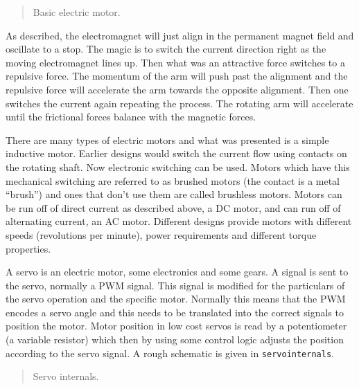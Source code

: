 \begin{quote}
Basic electric motor.
\end{quote}

As described, the electromagnet will just align in the permanent magnet
field and oscillate to a stop. The magic is to switch the current
direction right as the moving electromagnet lines up. Then what was an
attractive force switches to a repulsive force. The momentum of the arm
will push past the alignment and the repulsive force will accelerate the
arm towards the opposite alignment. Then one switches the current again
repeating the process. The rotating arm will accelerate until the
frictional forces balance with the magnetic forces.

There are many types of electric motors and what was presented is a
simple inductive motor. Earlier designs would switch the current flow
using contacts on the rotating shaft. Now electronic switching can be
used. Motors which have this mechanical switching are referred to as
brushed motors (the contact is a metal ``brush'') and ones that don't
use them are called brushless motors. Motors can be run off of direct
current as described above, a DC motor, and can run off of alternating
current, an AC motor. Different designs provide motors with different
speeds (revolutions per minute), power requirements and different torque
properties.

A servo is an electric motor, some electronics and some gears. A signal
is sent to the servo, normally a PWM signal. This signal is modified for
the particulars of the servo operation and the specific motor. Normally
this means that the PWM encodes a servo angle and this needs to be
translated into the correct signals to position the motor. Motor
position in low cost servos is read by a potentiometer (a variable
resistor) which then by using some control logic adjusts the position
according to the servo signal. A rough schematic is given in
\texttt{servointernals}.

\begin{quote}
Servo internals.
\end{quote}
